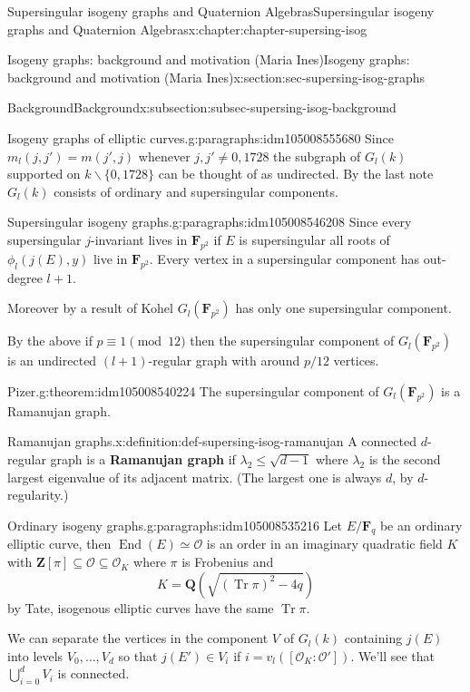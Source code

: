 \documentclass[oneside,10pt,]{book}
\newcommand{\terminology}[1]{\textbf{#1}}
\numberwithin{equation}{section}
\newcommand{\lb}{[}
\newcommand{\rb}{]}
\newcommand{\ZZ}{\mathbf{Z}}
\newcommand{\QQ}{\mathbf{Q}}
\newcommand{\FF}{\mathbf{F}}
\newcommand{\ints}{\mathcal{O}}
\DeclareMathOperator{\End}{End}
\DeclareMathOperator{\trace}{Tr}
\begin{document}
\begin{chapterptx}{Supersingular isogeny graphs and Quaternion Algebras}{}{Supersingular isogeny graphs and Quaternion Algebras}{}{}{x:chapter:chapter-supersing-isog}
\begin{sectionptx}{Isogeny graphs: background and motivation (Maria Ines)}{}{Isogeny graphs: background and motivation (Maria Ines)}{}{}{x:section:sec-supersing-isog-graphs}
\begin{subsectionptx}{Background}{}{Background}{}{}{x:subsection:subsec-supersing-isog-background}
\begin{paragraphs}{Isogeny graphs of elliptic curves.}{g:paragraphs:idm105008555680}
Since \(m_l(j,j') =  m(j',j)\) whenever \(j,j' \ne  0,1728\) the subgraph of \(G_l(k)\) supported on \(k\smallsetminus \{0,1728\}\) can be thought of as undirected. By the last note \(G_l(k)\) consists of ordinary and supersingular components.%
\end{paragraphs}%
\begin{paragraphs}{Supersingular isogeny graphs.}{g:paragraphs:idm105008546208}%
Since every supersingular \(j\)-invariant lives in \(\FF_{p^2}\) if \(E\) is supersingular all roots of \(\phi_l(j(E), y)\) live in \(\FF_{p^2}\). Every vertex in a supersingular component has out-degree \(l+1\).%
\par
Moreover by a result of Kohel \(G_l(\FF_{p^2})\) has only one supersingular component.%
\par
By the above if \(p \equiv 1 \pmod {12}\) then the supersingular component of \(G_l(\FF_{p^2})\) is an undirected \((l+1)\)-regular graph with around \(p/12\) vertices.%
\begin{theorem}{Pizer.}{}{g:theorem:idm105008540224}%
The supersingular component of \(G_l(\FF_{p^2})\) is a Ramanujan graph.%
\end{theorem}
\begin{definition}{Ramanujan graphs.}{x:definition:def-supersing-isog-ramanujan}%
A connected \(d\)-regular graph is a \terminology{Ramanujan graph} if \(\lambda_2 \le \sqrt{d-1}\) where \(\lambda_2\) is the second largest eigenvalue of its adjacent matrix. (The largest one is always \(d\), by \(d\)-regularity.)%
\end{definition}
\end{paragraphs}%
\begin{paragraphs}{Ordinary isogeny graphs.}{g:paragraphs:idm105008535216}%
Let \(E/\FF_q\) be an ordinary elliptic curve, then \(\End(E) \simeq \ints\) is an order in an imaginary quadratic field \(K\) with \(\ZZ\lb \pi \rb \subseteq \ints \subseteq \ints_K\) where \(\pi\) is Frobenius and%
\begin{equation*}
K = \QQ(\sqrt{(\trace \pi)^2 - 4q})
\end{equation*}
by Tate, isogenous elliptic curves have the same \(\trace \pi\).%
\par
We can separate the vertices in the component \(V\) of \(G_l(k)\) containing \(j(E)\) into levels \(V_0, \ldots, V_d\) so that \(j(E') \in V_i\) if \(i = v_l(\lb \ints_K : \ints'\rb)\). We'll see that \(\bigcup_{i=0}^d V_i\) is connected.%
\par

\end{paragraphs}
\end{subsectionptx}
\end{sectionptx}
\end{chapterptx}
\end{document}
